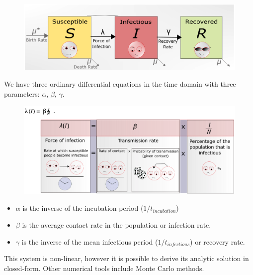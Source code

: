 \documentclass{article}\usepackage[]{graphicx}\usepackage[]{color}
\begin{document}
\begin{figure}
\includegraphics[width=1.0\textwidth]{"png/SIR2"}
\end{figure}

We have three ordinary differential equations in the time domain with three parameters: $\alpha$, $\beta$, $\gamma$.


\begin{figure}
\includegraphics[width=1.0\textwidth]{"png/SIR3"}
\end{figure}


\begin{itemize}

\item $\alpha$ is the inverse of the incubation period ($1/t_{incubation}$)

\item $\beta$ is the average contact rate in the population or infection rate.

\item $\gamma$ is the inverse of the mean infectious period ($1/t_{infectious}$) or recovery rate.

\end{itemize}

This system is non-linear, however it is possible to derive its analytic solution in closed-form. Other numerical tools include Monte Carlo methods.
\end{document}

